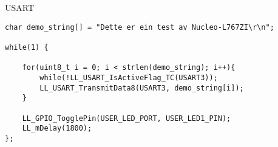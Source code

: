 \begin{frame}[containsverbatim]{USART}
	
	\begin{verbatim}
char demo_string[] = "Dette er ein test av Nucleo-L767ZI\r\n";

while(1) {
	
	for(uint8_t i = 0; i < strlen(demo_string); i++){
		while(!LL_USART_IsActiveFlag_TC(USART3));
		LL_USART_TransmitData8(USART3, demo_string[i]);
	}
	
	LL_GPIO_TogglePin(USER_LED_PORT, USER_LED1_PIN);
	LL_mDelay(1800);
};
	\end{verbatim}
	
\end{frame}


